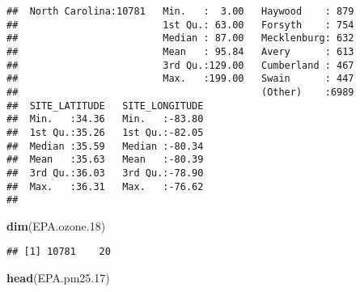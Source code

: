 \documentclass[]{article}
\newenvironment{Shaded}{\begin{snugshade}}{\end{snugshade}}
\newcommand{\KeywordTok}[1]{\textcolor[rgb]{0.13,0.29,0.53}{\textbf{#1}}}
\newcommand{\DecValTok}[1]{\textcolor[rgb]{0.00,0.00,0.81}{#1}}
\newcommand{\NormalTok}[1]{#1}
\begin{document}
\begin{verbatim}
##  North Carolina:10781   Min.   :  3.00   Haywood    : 879  
##                         1st Qu.: 63.00   Forsyth    : 754  
##                         Median : 87.00   Mecklenburg: 632  
##                         Mean   : 95.84   Avery      : 613  
##                         3rd Qu.:129.00   Cumberland : 467  
##                         Max.   :199.00   Swain      : 447  
##                                          (Other)    :6989  
##  SITE_LATITUDE   SITE_LONGITUDE  
##  Min.   :34.36   Min.   :-83.80  
##  1st Qu.:35.26   1st Qu.:-82.05  
##  Median :35.59   Median :-80.34  
##  Mean   :35.63   Mean   :-80.39  
##  3rd Qu.:36.03   3rd Qu.:-78.90  
##  Max.   :36.31   Max.   :-76.62  
## 
\end{verbatim}

\begin{Shaded}
\begin{Highlighting}[]
\KeywordTok{dim}\NormalTok{(EPA.ozone.}\DecValTok{18}\NormalTok{)}
\end{Highlighting}
\end{Shaded}

\begin{verbatim}
## [1] 10781    20
\end{verbatim}

\begin{Shaded}
\begin{Highlighting}[]
\KeywordTok{head}\NormalTok{(EPA.pm25.}\DecValTok{17}\NormalTok{)}
\end{Highlighting}
\end{Shaded}
\end{document}

